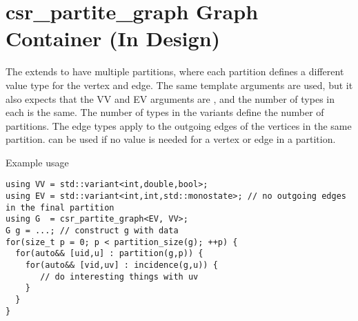 \section{csr\_partite\_graph Graph Container (In Design)}

The  extends  to have multiple partitions, where each partition defines a different value type for the vertex and edge. The same template arguments are used, but it also expects that the VV and EV arguments are , and the number of types in each is the same. The number of types in the variants define the number of partitions. The edge types apply to the outgoing edges of the vertices in the same partition.  can be used if no value is needed for a vertex or edge in a partition.

Example usage
\begin{lstlisting}
using VV = std::variant<int,double,bool>;
using EV = std::variant<int,int,std::monostate>; // no outgoing edges in the final partition
using G  = csr_partite_graph<EV, VV>;
G g = ...; // construct g with data
for(size_t p = 0; p < partition_size(g); ++p) {
  for(auto&& [uid,u] : partition(g,p)) {
    for(auto&& [vid,uv] : incidence(g,u)) {
       // do interesting things with uv
    }
  }
}
\end{lstlisting}
